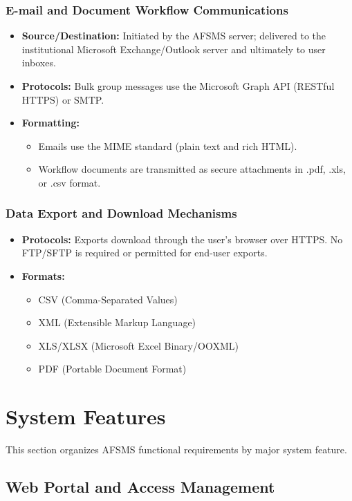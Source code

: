 \documentclass[11pt, a4paper]{article}
\begin{document}
\subsubsection{E-mail and Document Workflow Communications}
\begin{itemize}
    \item \textbf{Source/Destination:} Initiated by the AFSMS server; delivered to the institutional Microsoft Exchange/Outlook server and ultimately to user inboxes.
    \item \textbf{Protocols:} Bulk group messages use the Microsoft Graph API (RESTful HTTPS) or SMTP.
    \item \textbf{Formatting:}
    \begin{itemize}
        \item Emails use the MIME standard (plain text and rich HTML).
        \item Workflow documents are transmitted as secure attachments in .pdf, .xls, or .csv format.
    \end{itemize}
\end{itemize}

\subsubsection{Data Export and Download Mechanisms}
\begin{itemize}
    \item \textbf{Protocols:} Exports download through the user's browser over HTTPS. No FTP/SFTP is required or permitted for end-user exports.
    \item \textbf{Formats:}
    \begin{itemize}
        \item CSV (Comma-Separated Values)
        \item XML (Extensible Markup Language)
        \item XLS/XLSX (Microsoft Excel Binary/OOXML)
        \item PDF (Portable Document Format)
    \end{itemize}
\end{itemize}


\section{System Features}
This section organizes AFSMS functional requirements by major system feature.

\subsection{Web Portal and Access Management}
\end{document}
